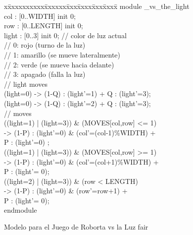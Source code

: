 \begin{figure}[t]
\centering
\begin{minipage}[t]{.47\textwidth}
{\fontsize{7.6}{7.6}\selectfont\ttfamily
\begin{tabbing}
x\=xxxxxxxxxx\=xxxxxx\=xxx\=xxxx\=xxx\=xxxx\= \kill    
module \roborta\_vs\_the\_light\\[1ex]
\>col : [0..WIDTH] init 0; \\
\>row : [0..LENGTH] init 0; \\
\>light : [0..3] init 0; \>\>\>\> // color de luz actual \\%
\>                   \>\>\>\>// 0: rojo (turno de la luz) \\%
\>                   \>\>\>\>// 1: amarillo (\roborta se mueve lateralmente) \\%
\>                   \>\>\>\>// 2: verde (\roborta se mueve hacia delante) \\%
\>                   \>\>\>\>// 3: apagado (falla la luz) \\[1ex]
\> // light moves \\[1ex]
\>[l\_y] (light=0) \> \>-> \>(1-Q) : (light'=1) + Q : (light'=3);\\[1ex]
\>[l\_g] (light=0) \> \>-> \>(1-Q) : (light'=2) + Q : (light'=3);\\[1ex]
\> // \roborta moves \\[1ex]
\>[r\_l]  ((light=1) | (light=3)) \& (MOVES[col,row] <= 1)  \\
\>                    \>\>-> \>(1-P) : (light'=0) \& (col'=(col-1)\%WIDTH) + \\       
\>                     \>\>\>  P : (light'=0) ; \\[1ex]

\>[r\_r] ((light=1) | (light=3)) \& (MOVES[col,row] >= 1)\\
\>                    \>\>-> \> (1-P) : (light'=0) \& (col'=(col+1)\%WIDTH) + \\
\>                     \>\>\> P : (light'= 0); \\[1ex]
\>[r\_f] ((light=2) | (light=3)) \& (row < LENGTH) \\
\>                    \>\>-> \> (1-P) : (light'=0) \& (row'=row+1)  + \\
\>                     \>\>\> P : (light'= 0);\\[1ex]
endmodule\\[-5ex]
\end{tabbing}}
\end{minipage}
\vspace{0.5cm}
\caption{Modelo para el Juego de Roborta vs la Luz fair} \label{fig:robot_game_model}
\end{figure}


